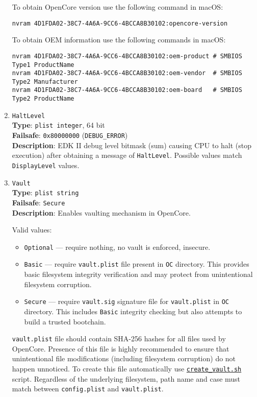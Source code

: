 \documentclass[]{article}
\providecommand{\tightlist}{%
  \setlength{\itemsep}{0pt}\setlength{\parskip}{0pt}}
\begin{document}
\begin{enumerate}
  To obtain OpenCore version use the following command in macOS:
\begin{lstlisting}[label=nvramver, style=ocbash]
nvram 4D1FDA02-38C7-4A6A-9CC6-4BCCA8B30102:opencore-version
\end{lstlisting}

  To obtain OEM information use the following commands in macOS:
\begin{lstlisting}[label=nvramver, style=ocbash]
nvram 4D1FDA02-38C7-4A6A-9CC6-4BCCA8B30102:oem-product # SMBIOS Type1 ProductName
nvram 4D1FDA02-38C7-4A6A-9CC6-4BCCA8B30102:oem-vendor  # SMBIOS Type2 Manufacturer
nvram 4D1FDA02-38C7-4A6A-9CC6-4BCCA8B30102:oem-board   # SMBIOS Type2 ProductName
\end{lstlisting}

\item
  \texttt{HaltLevel}\\
  \textbf{Type}: \texttt{plist\ integer}, 64 bit\\
  \textbf{Failsafe}: \texttt{0x80000000} (\texttt{DEBUG\_ERROR})\\
  \textbf{Description}: EDK II debug level bitmask (sum) causing CPU to
  halt (stop execution) after obtaining a message of \texttt{HaltLevel}.
  Possible values match \texttt{DisplayLevel} values.

\item
  \texttt{Vault}\\
  \textbf{Type}: \texttt{plist\ string}\\
  \textbf{Failsafe}: \texttt{Secure}\\
  \textbf{Description}: Enables vaulting mechanism in OpenCore.

  Valid values:

  \begin{itemize}
  \tightlist
  \item \texttt{Optional} --- require nothing, no vault is enforced, insecure.
  \item \texttt{Basic} --- require \texttt{vault.plist} file present
  in \texttt{OC} directory. This provides basic filesystem integrity
  verification and may protect from unintentional filesystem corruption.
  \item \texttt{Secure} --- require \texttt{vault.sig} signature file for
  \texttt{vault.plist} in \texttt{OC} directory. This includes \texttt{Basic}
  integrity checking but also attempts to build a trusted bootchain.
  \end{itemize}

  \texttt{vault.plist} file should contain SHA-256 hashes for all files used by OpenCore.
  Presence of this file is highly recommended to ensure that unintentional
  file modifications (including filesystem corruption) do not happen unnoticed.
  To create this file automatically use
  \href{https://github.com/acidanthera/OpenCorePkg/tree/master/Utilities/CreateVault}{\texttt{create\_vault.sh}} script.
  Regardless of the underlying filesystem, path name and case must match
  between \texttt{config.plist} and \texttt{vault.plist}.


\end{enumerate}
\end{document}
